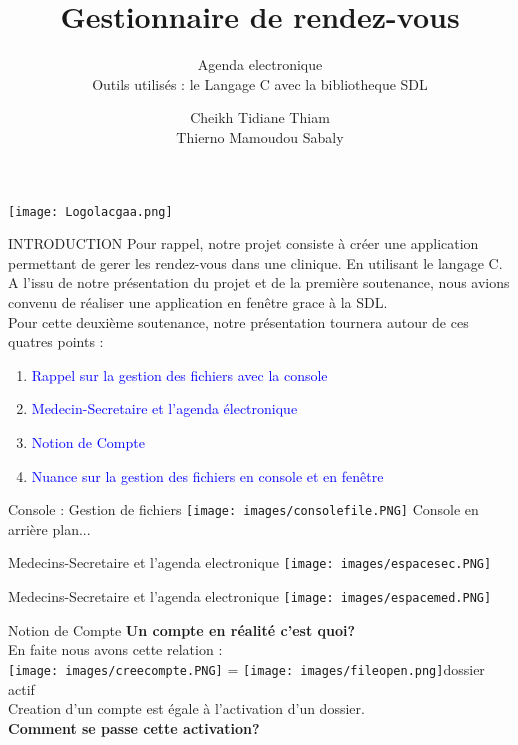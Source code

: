 \documentclass{beamer}
\title{Gestionnaire de rendez-vous}
\subtitle{Agenda electronique\\Outils utilisés : le  Langage C avec la bibliotheque SDL}
\institute[2017-2018]{Transmission des Données et Sécurité de l'Information}
\date{}
\author[L1TDSI]{Cheikh Tidiane Thiam\\Thierno Mamoudou Sabaly}
\begin{document}
\begin{frame}[t]
\texttt{[image: Logolacgaa.png]}
	\titlepage
\end{frame}

\begin{frame}[t]{INTRODUCTION}
Pour rappel, notre projet consiste à créer une application permettant de gerer les rendez-vous dans une clinique. En utilisant le langage C. A l'issu de notre présentation du projet et de la première soutenance, nous avions convenu de réaliser une application en fenêtre grace à la SDL.\pause \\Pour cette deuxième soutenance, notre présentation tournera autour de ces quatres points :\pause
\begin{enumerate}
\item \textcolor{blue}{Rappel sur la gestion des fichiers avec la console}\pause
\item \textcolor{blue}{Medecin-Secretaire et l'agenda électronique} \pause
\item \textcolor{blue}{Notion de Compte} \pause
\item \textcolor{blue}{Nuance sur la gestion des fichiers en console et en fenêtre} \pause
\end{enumerate}
\end{frame}

\begin{frame}{Console : Gestion de fichiers}
	\texttt{[image: images/consolefile.PNG]}
	 Console en arrière plan...
\end{frame}

\begin{frame}{Medecins-Secretaire et l'agenda electronique}
	\texttt{[image: images/espacesec.PNG]}
\end{frame}
\begin{frame}{Medecins-Secretaire et l'agenda electronique}
	\texttt{[image: images/espacemed.PNG]}
\end{frame}

\begin{frame}[t]{Notion  de Compte}\vspace{10pt}
	\textbf{Un compte en réalité c'est quoi?} \\ \pause
En faite nous avons cette relation :  \\  
\texttt{[image: images/creecompte.PNG]}   =  \pause
\texttt{[image: images/fileopen.png]}dossier actif\\ Creation d'un compte est égale à l'activation d'un dossier.\\ \pause
\textbf{Comment se passe cette activation?}
\end{frame}
\end{document}
